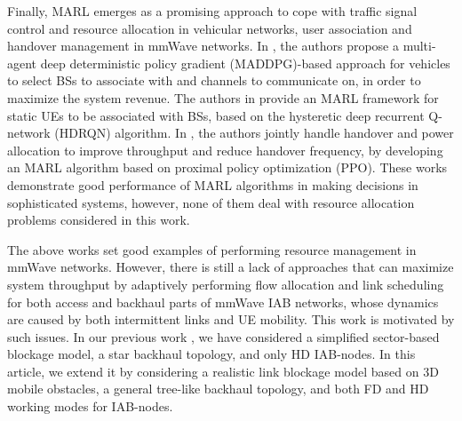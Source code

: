 Finally, MARL emerges as a promising approach to cope with traffic signal control \cite{chu2019multi} and 
resource allocation \cite{kwon2019multi} in vehicular networks, user association \cite{sana2020multi} and handover management \cite{guo2020joint} in mmWave networks.
In \cite{kwon2019multi}, the authors propose a multi-agent deep deterministic policy gradient (MADDPG)-based approach for vehicles to select BSs to associate with and channels to communicate on, in order to maximize the system revenue.
The authors in \cite{sana2020multi} provide an MARL framework for static UEs to be associated with BSs, based on the hysteretic deep recurrent Q-network (HDRQN) algorithm.
In \cite{guo2020joint}, the authors jointly handle handover and power allocation to improve throughput and reduce handover frequency, by developing an MARL algorithm based on proximal policy optimization (PPO).
These works demonstrate good performance of MARL algorithms in making decisions in sophisticated systems, however, none of them deal with resource allocation problems considered in this work.


The above works set good examples of performing resource management in mmWave networks. However, there is still a lack of approaches that can maximize system throughput by adaptively performing flow allocation and link scheduling for both access and backhaul parts of mmWave IAB networks, whose dynamics are caused by both intermittent links and UE mobility. This work is motivated by such issues. 
In our previous work \cite{zhang2021mobility}, we have considered a simplified sector-based blockage model, a star backhaul topology, and only HD IAB-nodes. In this article, we extend it by considering a realistic link blockage model based on 3D mobile obstacles, a general tree-like backhaul topology, and both FD and HD working modes for IAB-nodes.


